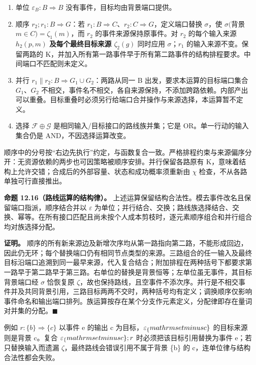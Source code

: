 \documentclass[UTF8,a4paper,zihao=-4,fontset=windows,openany]{ctexbook}
\def\mathrm#1{#1}%
\begin{document}
\begin{enumerate}
\item 单位 \(\varepsilon_B:B\Rightarrow B\) 没有事件，目标均由背景端口提供。
\item 顺序 \(r_{2};r_{1}:B\Rightarrow G\)：若 \(r_{1}:B\Rightarrow C\)、\(r_{2}:C\Rightarrow G\)，定义端口替换 \(\sigma\)，使 \(\sigma(\)背景 \(m\in C)=\zeta_{1}(m)\)，而 \(r_{2}\) 的事件来源保持原事件。对 \(r_{2}\) 的每个输入来源 \(h_{2}(p,m)\) \textbf{及每个最终目标来源 \(\zeta_{2}(g)\)} 同时应用 \(\sigma\)；\(r_{1}\) 的输入来源不变。保留两路的 K，并加入所有第一路事件早于所有第二路事件的结构排程要求。中间端口不匹配则未定义。
\item 并行 \(r_{1}\parallel r_{2}:B\Rightarrow G_{1}\cup G_{2}\)：两路从同一 B 出发，要求本运算的目标端口集合 \(G_{1}\)、\(G_{2}\) 不相交，事件名不相交，各自来源保持，不添加跨路依赖。内部产出可以重叠。目标重叠时必须另行给端口合并操作与来源选择，本运算暂不定义。
\item 选择 \(\mathcal{F}\oplus\mathcal{G}\) 是相同输入/目标接口的路线族并集；它是 OR。单一行动的输入集合仍是 AND，不因选择运算改变。
\end{enumerate}
顺序中的分号按“右边先执行”约定，与函数复合一致。严格排程约束与来源偏序分开：无资源依赖的两步也可因策略被顺序安排。并行保留各路原有 K，意味着结构上允许交错；合成后的外部容量、状态和成功概率须重新由 \(\chi\) 检查，不从各路单独可行直接推出。

\textbf{命题 12.16（路线运算的结构律）。} 上述运算保留结构合法性。模去事件改名且保留端口指派，顺序结合并以 \(\varepsilon\) 为单位；并行结合、交换；路线族选择结合、交换、幂等。在所有接口匹配且尚未按个人成本剪枝时，逐元素顺序组合和并行组合均对族选择分配。

\textbf{证明。} 顺序的所有新来源边及新增次序均从第一路指向第二路，不能形成回边，因此仍无环；每个替换端口仍有相同节点类型的来源。三路组合的任一输入及最终目标沿端口追溯到同一最早来源，代入复合结合；附加排程在两种括号下都要求第一路早于第二路早于第三路。右单位的替换是背景恒等；左单位虽无事件，其目标背景端口经 \(\sigma\) 恰恢复原 \(\zeta\)，故也保持路线，且空事件不添次序。并行是不相交事件并及共同背景引用，三路目标两两不交时，两种括号均有定义；调换顺序仅影响事件命名和输出端口排列。族运算按存在某个分支作元素定义，分配律即存在量词对并集的分配。\(\blacksquare\)

例如 \(r:\{b\}\Rightarrow\{c\}\) 以事件 e 的输出 c 为目标，\(\varepsilon_\{\\mathrm{setminus} {c\}}\) 的目标来源则是背景 c。复合 \(\varepsilon_\{\\mathrm{setminus} {c\}};r\) 时必须把该目标引用替换为事件 e；若只替换输入而遗漏 \(\zeta\)，最终路线会错误引用不属于背景 \{b\} 的 c，连单位律与结构合法性都会失败。
\end{document}
